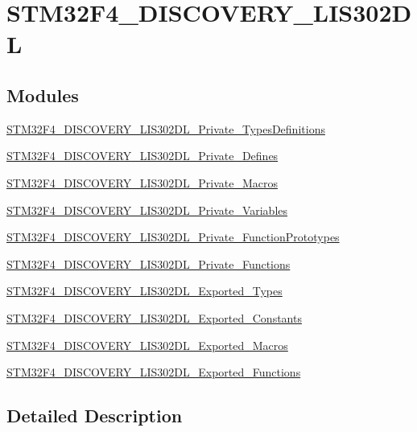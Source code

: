 \hypertarget{group___s_t_m32_f4___d_i_s_c_o_v_e_r_y___l_i_s302_d_l}{\section{S\-T\-M32\-F4\-\_\-\-D\-I\-S\-C\-O\-V\-E\-R\-Y\-\_\-\-L\-I\-S302\-D\-L}
\label{group___s_t_m32_f4___d_i_s_c_o_v_e_r_y___l_i_s302_d_l}
}
\subsection*{Modules}
\begin{DoxyCompactItemize}
\item 
\hyperlink{group___s_t_m32_f4___d_i_s_c_o_v_e_r_y___l_i_s302_d_l___private___types_definitions}{S\-T\-M32\-F4\-\_\-\-D\-I\-S\-C\-O\-V\-E\-R\-Y\-\_\-\-L\-I\-S302\-D\-L\-\_\-\-Private\-\_\-\-Types\-Definitions}
\item 
\hyperlink{group___s_t_m32_f4___d_i_s_c_o_v_e_r_y___l_i_s302_d_l___private___defines}{S\-T\-M32\-F4\-\_\-\-D\-I\-S\-C\-O\-V\-E\-R\-Y\-\_\-\-L\-I\-S302\-D\-L\-\_\-\-Private\-\_\-\-Defines}
\item 
\hyperlink{group___s_t_m32_f4___d_i_s_c_o_v_e_r_y___l_i_s302_d_l___private___macros}{S\-T\-M32\-F4\-\_\-\-D\-I\-S\-C\-O\-V\-E\-R\-Y\-\_\-\-L\-I\-S302\-D\-L\-\_\-\-Private\-\_\-\-Macros}
\item 
\hyperlink{group___s_t_m32_f4___d_i_s_c_o_v_e_r_y___l_i_s302_d_l___private___variables}{S\-T\-M32\-F4\-\_\-\-D\-I\-S\-C\-O\-V\-E\-R\-Y\-\_\-\-L\-I\-S302\-D\-L\-\_\-\-Private\-\_\-\-Variables}
\item 
\hyperlink{group___s_t_m32_f4___d_i_s_c_o_v_e_r_y___l_i_s302_d_l___private___function_prototypes}{S\-T\-M32\-F4\-\_\-\-D\-I\-S\-C\-O\-V\-E\-R\-Y\-\_\-\-L\-I\-S302\-D\-L\-\_\-\-Private\-\_\-\-Function\-Prototypes}
\item 
\hyperlink{group___s_t_m32_f4___d_i_s_c_o_v_e_r_y___l_i_s302_d_l___private___functions}{S\-T\-M32\-F4\-\_\-\-D\-I\-S\-C\-O\-V\-E\-R\-Y\-\_\-\-L\-I\-S302\-D\-L\-\_\-\-Private\-\_\-\-Functions}
\item 
\hyperlink{group___s_t_m32_f4___d_i_s_c_o_v_e_r_y___l_i_s302_d_l___exported___types}{S\-T\-M32\-F4\-\_\-\-D\-I\-S\-C\-O\-V\-E\-R\-Y\-\_\-\-L\-I\-S302\-D\-L\-\_\-\-Exported\-\_\-\-Types}
\item 
\hyperlink{group___s_t_m32_f4___d_i_s_c_o_v_e_r_y___l_i_s302_d_l___exported___constants}{S\-T\-M32\-F4\-\_\-\-D\-I\-S\-C\-O\-V\-E\-R\-Y\-\_\-\-L\-I\-S302\-D\-L\-\_\-\-Exported\-\_\-\-Constants}
\item 
\hyperlink{group___s_t_m32_f4___d_i_s_c_o_v_e_r_y___l_i_s302_d_l___exported___macros}{S\-T\-M32\-F4\-\_\-\-D\-I\-S\-C\-O\-V\-E\-R\-Y\-\_\-\-L\-I\-S302\-D\-L\-\_\-\-Exported\-\_\-\-Macros}
\item 
\hyperlink{group___s_t_m32_f4___d_i_s_c_o_v_e_r_y___l_i_s302_d_l___exported___functions}{S\-T\-M32\-F4\-\_\-\-D\-I\-S\-C\-O\-V\-E\-R\-Y\-\_\-\-L\-I\-S302\-D\-L\-\_\-\-Exported\-\_\-\-Functions}
\end{DoxyCompactItemize}


\subsection{Detailed Description}
